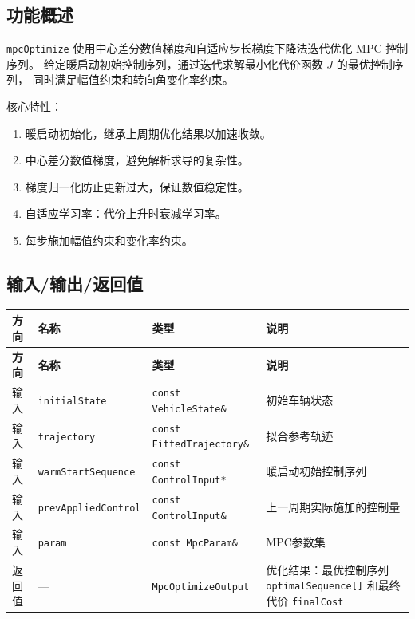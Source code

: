 \documentclass[a4paper,10pt]{article}
\begin{document}
\subsection{功能概述}

\texttt{mpcOptimize} 使用中心差分数值梯度和自适应步长梯度下降法迭代优化 MPC 控制序列。
给定暖启动初始控制序列，通过迭代求解最小化代价函数 $J$ 的最优控制序列，
同时满足幅值约束和转向角变化率约束。

核心特性：
\begin{enumerate}
  \item 暖启动初始化，继承上周期优化结果以加速收敛。
  \item 中心差分数值梯度，避免解析求导的复杂性。
  \item 梯度归一化防止更新过大，保证数值稳定性。
  \item 自适应学习率：代价上升时衰减学习率。
  \item 每步施加幅值约束和变化率约束。
\end{enumerate}

\subsection{输入/输出/返回值}

\renewcommand{\arraystretch}{1.3}
\begin{longtable}{|C{1.5cm}|L{3.5cm}|C{3cm}|L{7cm}|}
\hline
\textbf{方向} & \textbf{名称} & \textbf{类型} & \textbf{说明} \\
\hline
\endfirsthead
\hline
\textbf{方向} & \textbf{名称} & \textbf{类型} & \textbf{说明} \\
\hline
\endhead
输入 & \texttt{initialState} & \texttt{const VehicleState\&} & 初始车辆状态 \\
\hline
输入 & \texttt{trajectory} & \texttt{const FittedTrajectory\&} & 拟合参考轨迹 \\
\hline
输入 & \texttt{warmStartSequence} & \texttt{const ControlInput*} & 暖启动初始控制序列 \\
\hline
输入 & \texttt{prevAppliedControl} & \texttt{const ControlInput\&} & 上一周期实际施加的控制量 \\
\hline
输入 & \texttt{param} & \texttt{const MpcParam\&} & MPC参数集 \\
\hline
返回值 & --- & \texttt{MpcOptimizeOutput} & 优化结果：最优控制序列 \texttt{optimalSequence[]} 和最终代价 \texttt{finalCost} \\
\hline
\end{longtable}

\end{document}
